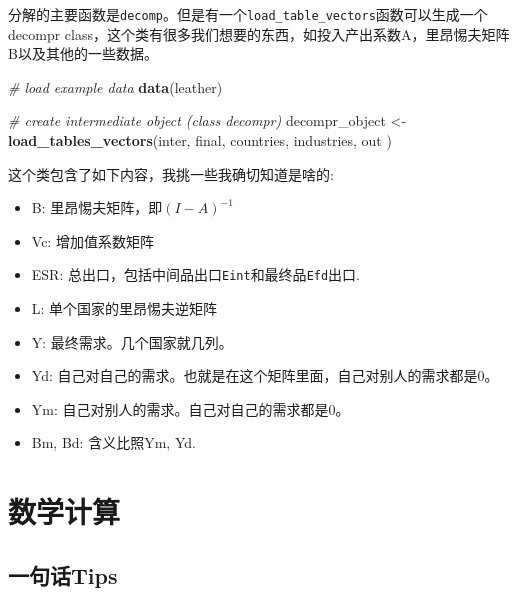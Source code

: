 \documentclass[
]{book}
\newenvironment{Shaded}{\begin{snugshade}}{\end{snugshade}}
\newcommand{\CommentTok}[1]{\textcolor[rgb]{0.56,0.35,0.01}{\textit{#1}}}
\newcommand{\KeywordTok}[1]{\textcolor[rgb]{0.13,0.29,0.53}{\textbf{#1}}}
\newcommand{\NormalTok}[1]{#1}
\newcommand{\StringTok}[1]{\textcolor[rgb]{0.31,0.60,0.02}{#1}}
\providecommand{\tightlist}{%
  \setlength{\itemsep}{0pt}\setlength{\parskip}{0pt}}
\begin{document}
分解的主要函数是\texttt{decomp}。但是有一个\texttt{load\_table\_vectors}函数可以生成一个decompr class，这个类有很多我们想要的东西，如投入产出系数A，里昂惕夫矩阵B以及其他的一些数据。

\begin{Shaded}
\begin{Highlighting}[]
\CommentTok{# load example data}
\KeywordTok{data}\NormalTok{(leather)}

\CommentTok{# create intermediate object (class decompr)}
\NormalTok{decompr_object <-}\StringTok{ }\KeywordTok{load_tables_vectors}\NormalTok{(inter,}
\NormalTok{                                      final,}
\NormalTok{                                      countries,}
\NormalTok{                                      industries,}
\NormalTok{                                      out        )}
\end{Highlighting}
\end{Shaded}

这个类包含了如下内容，我挑一些我确切知道是啥的:

\begin{itemize}
\tightlist
\item
  B: 里昂惕夫矩阵，即\((I-A)^{-1}\)
\item
  Vc: 增加值系数矩阵
\item
  ESR: 总出口，包括中间品出口\texttt{Eint}和最终品\texttt{Efd}出口.
\item
  L: 单个国家的里昂惕夫逆矩阵
\item
  Y: 最终需求。几个国家就几列。
\item
  Yd: 自己对自己的需求。也就是在这个矩阵里面，自己对别人的需求都是0。
\item
  Ym: 自己对别人的需求。自己对自己的需求都是0。
\item
  Bm, Bd: 含义比照Ym, Yd.
\end{itemize}

\hypertarget{math}{%
\chapter{数学计算}\label{math}}

\hypertarget{ux4e00ux53e5ux8bddtips-6}{%
\section{一句话Tips}\label{ux4e00ux53e5ux8bddtips-6}}
\end{document}
